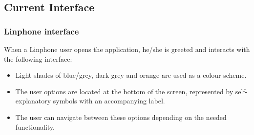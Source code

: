 \documentclass[11pt]{article}
\begin{document}
\subsection{Current Interface}
\subsubsection{Linphone interface}
When a Linphone user opens the application, he/she is greeted and interacts with the following interface:
\begin{itemize}
\item	Light shades of blue/grey, dark grey and orange are used as a colour scheme.
\item	The user options are located at the bottom of the screen, represented by self-explanatory symbols with an accompanying label.
\item	The user can navigate between these options depending on the needed functionality.
\end{itemize}
\end{document}
